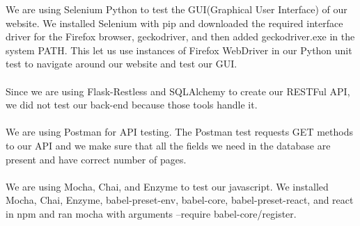 \documentclass[12pt]{article}
\begin{document}
We are using Selenium Python to test the GUI(Graphical User Interface) of our website. We installed Selenium with pip and downloaded the required interface driver for the Firefox browser, geckodriver, and then added geckodriver.exe in the system PATH. This let us use instances of Firefox WebDriver in our Python unit test to navigate around our website and test our GUI.
\\
\\
Since we are using Flask-Restless and SQLAlchemy to create our RESTFul API, we did not test our back-end because those tools handle it.
\\
\\
We are using Postman for API testing. The Postman test requests GET methods to our API and we make sure that all the fields we need in the database are present and have correct number of pages. 
\\
\\
We are using Mocha, Chai, and Enzyme to test our javascript. We installed Mocha, Chai, Enzyme, babel-preset-env, babel-core, babel-preset-react, and react in npm and ran mocha with arguments --require babel-core/register.
\end{document}
